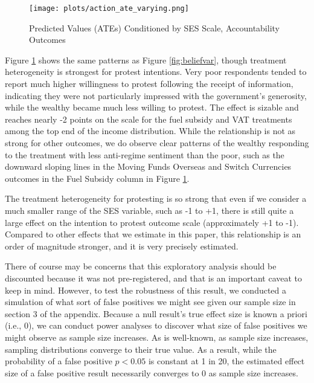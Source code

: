 \documentclass[12pt, letterpaper]{article}
\begin{document}
\begin{figure}
    \centering
    \texttt{[image: plots/action\_ate\_varying.png]}
    \caption{Predicted Values (ATEs) Conditioned by SES Scale, Accountability Outcomes}
    \label{fig:actionvar}
\end{figure}

Figure \ref{fig:actionvar} shows the same patterns as Figure \ref{fig:beliefvar}, though treatment heterogeneity is strongest for protest intentions. Very poor respondents tended to report much higher willingness to protest following the receipt of information, indicating they were not particularly impressed with the government's generosity, while the wealthy became much less willing to protest. The effect is sizable and reaches nearly -2 points on the scale for the fuel subsidy and VAT treatments among the top end of the income distribution. While the relationship is not as strong for other outcomes, we do observe clear patterns of the wealthy responding to the treatment with less anti-regime sentiment than the poor, such as the downward sloping lines in the Moving Funds Overseas and Switch Currencies outcomes in the Fuel Subsidy column in Figure \ref{fig:actionvar}.

The treatment heterogeneity for protesting is so strong that even if we consider a much smaller range of the SES variable, such as -1 to +1, there is still quite a large effect on the intention to protest outcome scale (approximately +1 to -1). Compared to other effects that we estimate in this paper, this relationship is an order of magnitude stronger, and it is very precisely estimated. 

There of course may be concerns that this exploratory analysis should be discounted because it was not pre-registered, and that is an important caveat to keep in mind. However, to test the robustness of this result, we conducted a simulation of what sort of false positives we might see given our sample size in section 3 of the appendix. Because a null result's true effect size is known a priori (i.e., 0), we can conduct power analyses to discover what size of false positives we might observe as sample size increases. As is well-known, as sample size increases, sampling distributions converge to their true value. As a result, while the probability of a false positive $p<0.05$ is constant at 1 in 20, the estimated effect size of a false positive result necessarily converges to 0 as sample size increases.
\end{document}
